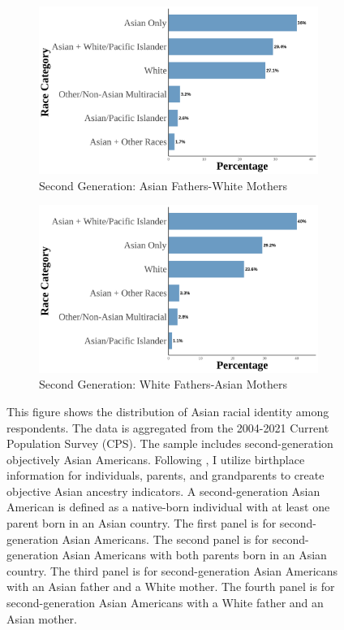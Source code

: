 \begin{landscape}
\begin{figure}[!htb]
\begin{subfigure}{.48\textwidth}
\caption{Second Generation: Asian Fathers-White Mothers}
\centering
\includegraphics[width=1\linewidth]{histogram_asian_american_race_secondgen_AW.png}
\end{subfigure}
\hfill
\begin{subfigure}{.48\textwidth}
\caption{Second Generation: White Fathers-Asian Mothers}
\centering
\includegraphics[width=1\linewidth]{histogram_asian_american_race_secondgen_WA.png}
\end{subfigure}

\caption*{\footnotesize{This figure shows the distribution of Asian racial identity among respondents. 
The data is aggregated from the 2004-2021 Current Population Survey (CPS). 
The sample includes second-generation objectively Asian Americans.
Following \textcite{antmanEthnicAttritionObserved2016,antmanEthnicAttritionAssimilation2020}, 
I utilize birthplace information for individuals, parents, and grandparents to create objective Asian ancestry indicators.
A second-generation Asian American is defined as a native-born individual with at least one parent born in an Asian country. 
The first panel is for second-generation Asian Americans. The second panel is for second-generation Asian Americans with both parents born in an Asian country. 
The third panel is for second-generation Asian Americans with an Asian father and a White mother. 
The fourth panel is for second-generation Asian Americans with a White father and an Asian mother.
}}
\end{figure}
\end{landscape}

